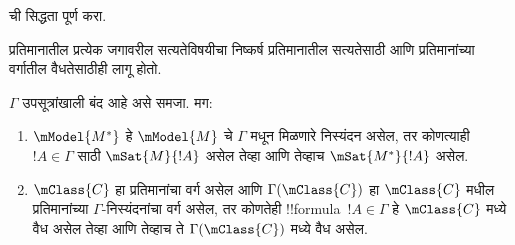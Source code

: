\documentclass[../../../include/open-logic-section]{subfiles}
\begin{document}
\begin{prob}
   ची सिद्धता पूर्ण करा.
\end{prob}

प्रतिमानातील प्रत्येक जगावरील सत्यतेविषयीचा निष्कर्ष
प्रतिमानातील सत्यतेसाठी आणि प्रतिमानांच्या वर्गातील
वैधतेसाठीही लागू होतो.

\begin{cor}
  $\Gamma$ उपसूत्रांखाली बंद आहे असे समजा. मग:
  \begin{enumerate}
  \item $\mModel{M^*}$ हे $\mModel{M}$ चे $\Gamma$
    मधून मिळणारे निस्यंदन असेल, तर कोणत्याही
    $!A \in \Gamma$ साठी $\mSat{M}{!A}$ असेल तेव्हा
    आणि तेव्हाच $\mSat{M^*}{!A}$ असेल.
  \item $\mClass{C}$ हा प्रतिमानांचा वर्ग असेल आणि
    $\Gamma(\mClass{C})$ हा $\mClass{C}$ मधील प्रतिमानांच्या
    $\Gamma$-निस्यंदनांचा वर्ग असेल, तर कोणतेही
    !!{formula}~$!A \in \Gamma$ हे $\mClass{C}$ मध्ये
    वैध असेल तेव्हा आणि तेव्हाच ते
    $\Gamma(\mClass{C})$ मध्ये वैध असेल.
  \end{enumerate}
\end{cor}
\end{document}
